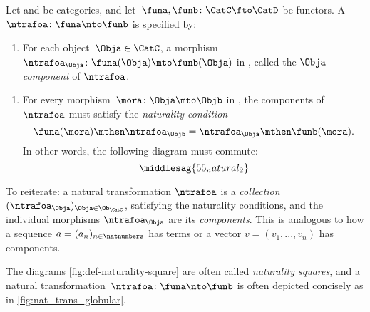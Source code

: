 \begin{ctdefinition}
    \label{def:natural-transformation}
    Let \CatC and \CatD be categories, and let~$\funa,\funb\colon \CatC\fto \CatD$ be functors.
    A \emph{}~$\ntrafoa \colon \funa\nto \funb$ is specified by:

    \constit
    \begin{enumerate}
        \item For each object~$\Obja\in \CatC$, a morphism $\ntrafoa_\Obja \colon \funa(\Obja)\mto \funb(\Obja)$ in \CatD, called the $\Obja$\emph{-component} of $\ntrafoa$.
    \end{enumerate}
    \condit
    \begin{enumerate}
        \item For every morphism~$\mora\colon \Obja\mto \Objb$ in \CatC, the components of $\ntrafoa$ must satisfy the \emph{naturality condition}
              \begin{equation}
                  \funa(\mora)\mthen \ntrafoa_\Objb = \ntrafoa_\Obja\mthen \funb(\mora).
              \end{equation}
              In other words, the following diagram must commute:
              \begin{equation}
                  \label{fig:def-naturality-square}
                  \middlesag{55_natural_2}
              \end{equation}
    \end{enumerate}
\end{ctdefinition}

To reiterate: a natural transformation $\ntrafoa$ is a \emph{collection} $(\ntrafoa_\Obja)_{\Obja \in \Ob_\CatC}$, satisfying the naturality conditions, and the individual morphisms $\ntrafoa_\Obja$ are its \emph{components}.
This is analogous to how a sequence $a = (a_n)_{n \in \natnumbers}$ has terms or a vector $v = (v_1, .
    .. , v_n)$ has components.

The diagrams \cref{fig:def-naturality-square} are often called \emph{naturality squares}, and a natural transformation~$\ntrafoa \colon \funa\nto \funb$ is often depicted concisely as in \cref{fig:nat_trans_globular}.

\begin{marginfigure}
    \centering
    \caption{}
    \label{fig:nat_trans_globular}
\end{marginfigure}
\begin{figure}[h!]
    \centering
    \begin{ctdefinitionshade}
    \end{ctdefinitionshade}
    \caption{}
    \label{fig:nat_trans_graphically}
\end{figure}

